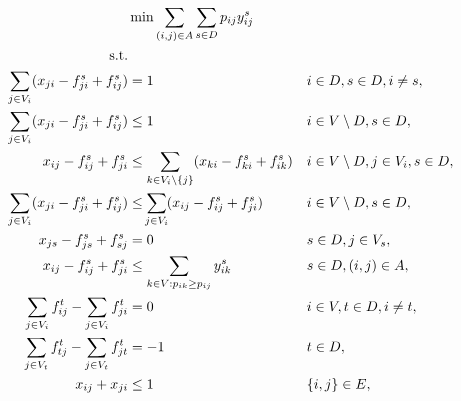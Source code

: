 \begin{subequations}
\begin{flalign}
\label{objective:mfinpf2} &\makebox[0pt][l]{$\displaystyle{}\min \sum\limits_{(i,j) \in A} \sum\limits_{s \in D} p_{ij} y^s_{ij} $}  & &&\\ \notag  
   \text{s.t.}&  &  &                 && \\	\
     \label{con:mfinpf2:arrowFromDest}  \sum\limits_{j\in V_i}(x_{ji}-f^s_{ji}+f^s_{ij})          & = 1       			&& i\in D, s\in D, i \neq s, && \\ 
		  \label{con:mfinpf2:arrowFromNonDestB}  \sum\limits_{j \in V_i}(x_{ji}-f^s_{ji}+f^s_{ij})  &\leq 1 && i\in V \setminus D, s\in D,   &&\\		
		  \label{con:mfinpf2:arrowFromNonDestA}  x_{ij}-f^s_{ij}+f^s_{ji}  & \leq \sum\limits_{k \in V_i\setminus\{j\}}(x_{ki}-f^s_{ki}+f^s_{ik}) &&
		  i\in V \setminus D,j\in V_i, s\in D,   &&\\		  
      \label{con:mfinpf2:extraCon}  \sum\limits_{j \in V_i}(x_{ji}-f^s_{ji}+f^s_{ij}) & \leq \sum_{\mathclap{j \in V_i}}(x_{ij}-f^s_{ij}+f^s_{ji}) &&  i\in V\setminus D, s\in D,  &&\\			  \label{con:mfinpf2:startInSource}  x_{js} - f^s_{js}+f^s_{sj}    & = 0       			&&  s\in D, j\in V_s, &&\\		 
		  \label{con:mfinpf2:yvar}  x_{ij}-f^s_{ij}+f^s_{ji} & \leq \sum\limits_{k\in V:p_{ik}\geq p_{ij}}y^s_{ik} && s\in D, (i,j)\in A, 		&&\\  
		 		 \label{con:mfinpf2:flowNormal}  \sum\limits_{\substack{ j\in V_i }}f^t_{ij}-\sum\limits_{\substack{j\in V_i }}f^t_{ji}    & = 0     			&& i\in V, t\in D, i \neq t, &&\\	
		 	 \label{con:mfinpf2:flowDest}  \sum\limits_{\substack{j\in V_t}}f^t_{tj}-\sum\limits_{\substack{j\in V_t}}f^t_{jt}    & = -1     			&&  t \in D, &&\\	
		    \label{con:mfinpf2:zbound} x_{ij}+x_{ji}&\leq 1 &&\{i,j\}\in E, \\

\end{flalign}
\end{subequations}
